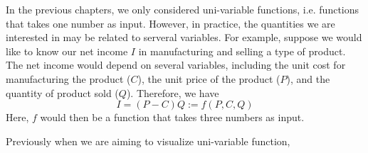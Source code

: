 In the previous chapters, we only considered uni-variable functions, i.e. functions that takes one number as input.  However, in practice, the quantities we are interested in may be related to serveral variables.  For example, suppose we would like to know our net income $I$ in manufacturing and selling a type of product.  The net income would depend on several variables, including the unit cost for manufacturing the product ($C$), the unit price of the product ($P$), and the quantity of product sold ($Q$).  Therefore, we have 
\[I = (P-C)Q := f(P,C,Q)\]
Here, $f$ would then be a function that takes three numbers as input. 

Previously when we are aiming to visualize uni-variable function, 